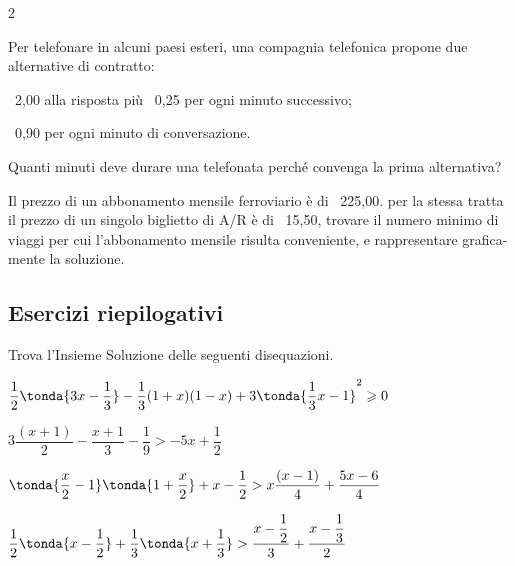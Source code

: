 \begin{htmulticols}{2}
\begin{esercizio}[]
\label{ese:dis_}
Per telefonare in alcuni paesi esteri, una compagnia telefonica
propone due alternative di contratto:
\begin{enumeratea}
\item \officialeuro\ 2,00 alla risposta più \officialeuro\ 0,25 per ogni 
minuto successivo;
\item \officialeuro\ 0,90 per ogni minuto di conversazione.
\end{enumeratea}
Quanti minuti deve durare una telefonata perché convenga la prima
alternativa?
\end{esercizio}

\begin{esercizio}[]
\label{ese:dis_}
Il prezzo di un abbonamento mensile ferroviario è di \officialeuro\ 225,00.
per la stessa tratta il prezzo di un singolo biglietto di A/R è 
di \officialeuro\ 15,50, trovare il numero minimo di viaggi per
cui l'abbonamento mensile risulta conveniente, e
rappresentare grafica-mente la soluzione.
\end{esercizio}


\end{htmulticols}

\subsection{Esercizi riepilogativi}

\begin{esercizio}[*]
\label{ese:21.15}
Trova l'Insieme Soluzione delle seguenti disequazioni.
\begin{enumeratea}
\item
\(\dfrac{1}{2}\tonda{3x-\dfrac{1}{3}}-\dfrac{1}{3}(1+x)(1-x)+
3\tonda{\dfrac{1}{3}x-1}^{2}\geqslant 0\)
\sol{\R}
\item
\(3\dfrac{(x+1)}{2}-\dfrac{x+1}{3}-\dfrac{1}{9}>-5x+\dfrac{1}{2}\)
\item
\(\tonda{\dfrac{x}{2}-1}\tonda{1+\dfrac{x}{2}}+x-\dfrac{1}{2}>
x\dfrac{(x-1)}{4}+\dfrac{5x-6}{4}\)
\sol{\emptyset}
\item
\(\dfrac{1}{2}\tonda{x-\dfrac{1}{2}}+\dfrac{1}{3}\tonda{x+
\dfrac{1}{3}}>\dfrac{x-\dfrac{1}{2}}{3}+\dfrac{x-\dfrac{1}{3}}{2}\)
\sol{\R}
\end{enumeratea}
\end{esercizio}

